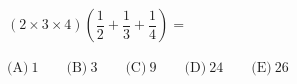 $(2\times 3\times 4)\left(\dfrac{1}{2}+\dfrac{1}{3}+\dfrac{1}{4}\right) =$



$\text{(A)}\ 1 \qquad \text{(B)}\ 3 \qquad \text{(C)}\ 9 \qquad \text{(D)}\ 24 \qquad \text{(E)}\ 26$
